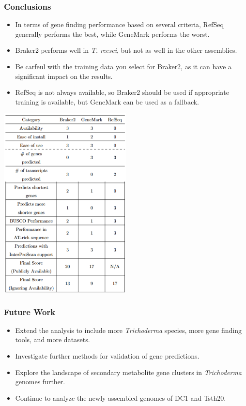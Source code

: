 \documentclass[t]{beamer}
\begin{document}
\begin{frame}
	\frametitle{Conclusions}
	\begin{itemize}
		\item In terms of gene finding performance based on several criteria, RefSeq generally performs the best, while GeneMark performs the worst.
		\item Braker2 performs well in \textit{T. reesei}, but not as well in the other assemblies.
		\item Be carfeul with the training data you select for Braker2, as it can have a significant impact on the results.
		\item RefSeq is not always available, so Braker2 should be used if appropriate training is available, but GeneMark can be used as a fallback.
	\end{itemize}
\end{frame}

\begin{frame}
	\vspace{0.75cm}
	\centering
	\includegraphics[width=0.5\textwidth]{../../working-thesis/figures/conclusion-snip.png}
\end{frame}

\begin{frame}
	\frametitle{Future Work}
	\begin{itemize}
		\item Extend the analysis to include more \textit{Trichoderma} species, more gene finding tools, and more datasets.
		\item Investigate further methods for validation of gene predictions.
		\item Explore the landscape of secondary metabolite gene clusters in \textit{Trichoderma} genomes further.
		\item Continue to analyze the newly assembled genomes of DC1 and Tsth20.
	\end{itemize}
\end{frame}
\end{document}
